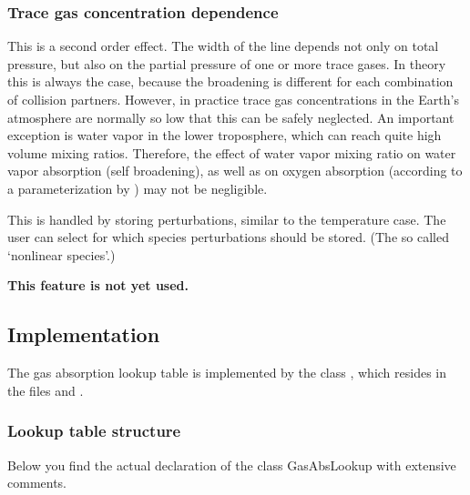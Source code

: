 \subsubsection{Trace gas concentration dependence}

This is a second order effect. The width of the line depends not only
on total pressure, but also on the partial pressure of one or more
trace gases. In theory this is always the case, because the broadening
is different for each combination of collision partners. However, in
practice trace gas concentrations in the Earth's atmosphere are
normally so low that this can be safely neglected. An important
exception is water vapor in the lower troposphere, which can reach
quite high volume mixing ratios. Therefore, the effect of water vapor
mixing ratio on water vapor absorption (self broadening), as well as
on oxygen absorption (according to a parameterization by
\citet{pwr:93}) may not be negligible.

This is handled by storing perturbations, similar to the temperature
case. The user can select for which species perturbations should be
stored. (The so called `nonlinear species'.)

\textbf{This feature is not yet used.}


\subsection{Implementation}
The gas absorption lookup table is implemented by the class
, which resides in the files
 and .

\subsubsection{Lookup table structure}

Below you find the actual declaration of the class GasAbsLookup with
extensive comments.

